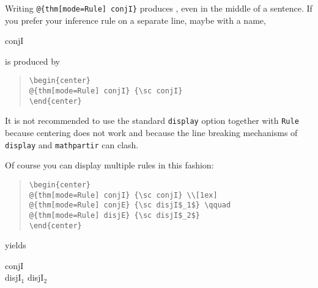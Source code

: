 \begin{isabellebody}
\begin{isamarkuptext}
Writing \verb!@!\verb!{thm[mode=Rule] conjI}! produces
, even in the middle of a sentence.
If you prefer your inference rule on a separate line, maybe with a name,
\begin{center}
 {\sc conjI}
\end{center}
is produced by
\begin{quote}
\verb!\begin{center}!\\
\verb!@!\verb!{thm[mode=Rule] conjI} {\sc conjI}!\\
\verb!\end{center}!
\end{quote}
It is not recommended to use the standard \texttt{display} option
together with \texttt{Rule} because centering does not work and because
the line breaking mechanisms of \texttt{display} and \texttt{mathpartir} can
clash.

Of course you can display multiple rules in this fashion:
\begin{quote}
\verb!\begin{center}!\\
\verb!@!\verb!{thm[mode=Rule] conjI} {\sc conjI} \\[1ex]!\\
\verb!@!\verb!{thm[mode=Rule] conjE} {\sc disjI$_1$} \qquad!\\
\verb!@!\verb!{thm[mode=Rule] disjE} {\sc disjI$_2$}!\\
\verb!\end{center}!
\end{quote}
yields
\begin{center}\small
{} {\sc conjI} \\[1ex]
 {\sc disjI$_1$} \qquad
{} {\sc disjI$_2$}
\end{center}


\end{isamarkuptext}
\end{isabellebody}
